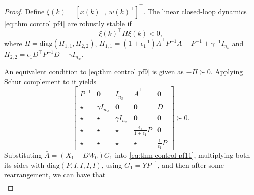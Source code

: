 \documentclass[letterpaper, 10 pt, conference]{ieeeconf}
\begin{document}
\begin{proof}
		Define $\xi(k) = [x(k)^\top, ~w(k)^\top]^\top$. The linear closed-loop 
		dynamics \eqref{eq:thm control pf4} are robustly stable if 
		\begin{equation}\label{eq:thm control pf9}
			\xi(k)^\top	\Pi \xi(k)
			< 0,
		\end{equation}	
		where $\Pi = \text{diag}(\Pi_{1,1},\Pi_{2,2})$, $\Pi_{1,1} = (1+\epsilon_1^{-1}) \bar{A}^\top P^{-1}  \bar{A} - P^{-1} + \gamma^{-1} I_{n_x}$ and $\Pi_{2,2} = \epsilon_1 D^\top P^{-1} D - \gamma I_{n_w}$.
		
		An equivalent condition to \eqref{eq:thm control pf9} is given as
$-\Pi \succ 0$. Applying Schur complement \cite{SchererWeiland00} to it yields
		\begin{equation}\label{eq:thm control pf11}	
			\begin{bmatrix}
				P^{-1}  & \mathbf{0} & I_{n_x} & \bar{A}^\top & 
				\mathbf{0}\\
				\star & \gamma I_{n_w} & \mathbf{0} & \mathbf{0} & D^\top  \\
				\star & \star & \gamma I_{n_x} & \mathbf{0} & \mathbf{0}\\
				\star & \star & \star & \frac{\epsilon_1}{1 + \epsilon_1} P & \mathbf{0} \\
				\star & \star & \star & \star & \frac{1}{\epsilon_1} P
			\end{bmatrix} 
			\succ 0.
		\end{equation}	
		Substituting $\bar{A} = (X_1 - D W_0) G_1$ into \eqref{eq:thm control pf11}, multiplying both its sides with $\text{diag}(P,I,I,I,I)$, using $G_1 = Y P^{-1}$, and then after some rearrangement, we can have that
%		
		\begin{align}\label{eq:thm control pf13}

\end{align}
\end{proof}
\end{document}
